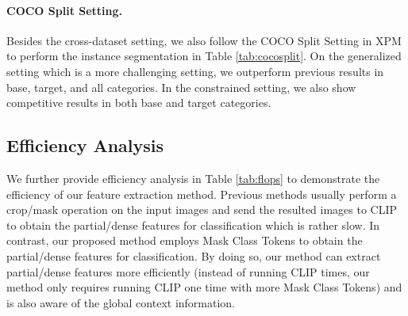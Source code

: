 \documentclass{article}
\theoremstyle{plain}
\theoremstyle{definition}
\theoremstyle{remark}
\begin{document}
\paragraph{COCO Split Setting.} Besides the cross-dataset setting, we also follow the COCO Split Setting in XPM\citep{huynh2022open} to perform the instance segmentation in Table \ref{tab:cocosplit}. On the generalized setting which is a more challenging setting, we outperform previous results in base, target, and all categories. In the constrained setting, we also show competitive results in both base and target categories.

\begin{table}[H]
\begin{center}
\caption{ \small \textbf{Results on open-vocabulary instance segmentation under the COCO split setting.}}
\label{tab:cocosplit}
\end{center}
\end{table}

\subsection{Efficiency Analysis}

We further provide efficiency analysis in Table \ref{tab:flops} to demonstrate the efficiency of our feature extraction method. Previous methods usually perform a crop/mask operation on the input images and send the resulted images to CLIP to obtain the partial/dense features for classification which is rather slow. In contrast, our proposed method employs Mask Class Tokens to obtain the partial/dense features for classification. By doing so, our method can extract partial/dense features more efficiently (instead of running CLIP  times, our method only requires running CLIP one time with  more Mask Class Tokens) and is also aware of the global context information.
\end{document}

